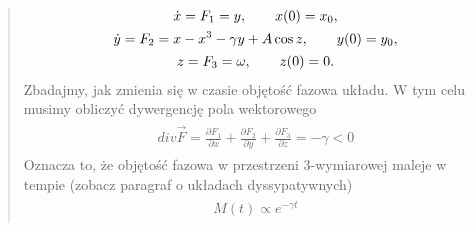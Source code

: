 \documentclass[a4paper,12pt,polish]{sphinxmanual}
\begin{document}
\begin{quote}
\label{ch2/chII012:equation-eqn11}\begin{gather}
\begin{split}\dot x = F_1 = y , \qquad x(0) = x_0,\end{split}\label{ch2/chII012-eqn11}\\\begin{split}\dot y = F_2 = x - x^3 -\gamma y + A \cos z , \qquad y(0) = y_0,\end{split}\notag\\\begin{split}z = F_3 = \omega, \qquad z(0) = 0.\end{split}\notag
\end{gather}
Zbadajmy, jak zmienia się w czasie objętość fazowa układu.  W tym celu musimy obliczyć dywergencję pola wektorowego
\label{ch2/chII012:equation-eqn12}\begin{gather}
\begin{split} div  \vec F = \frac{\partial F_1}{\partial x} + \frac{\partial F_2}{\partial y} + \frac{\partial F_3}{\partial z}  = -\gamma < 0\end{split}\label{ch2/chII012-eqn12}
\end{gather}
Oznacza to, że objętość fazowa w przestrzeni 3-wymiarowej maleje w tempie (zobacz paragraf o układach dyssypatywnych)
\label{ch2/chII012:equation-eqn13}\begin{gather}
\begin{split}M(t) \propto e^{-\gamma t}\end{split}\label{ch2/chII012-eqn13}
\end{gather}\end{quote}
\end{document}
